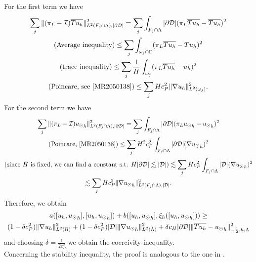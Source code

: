 For the first term we have
\begin{multline*}
\sum _j  \|(\pi_L - \mathcal{I})\avrc{Tu_h}\|^2_{L^2(F_j\cap \Lambda),|\DD|} =\sum _j \int _{F_j \cap \Lambda} |\DD| (\pi_L \avrc{Tu_h}- \avrc{Tu_h})^2
\\
(\text{Average inequality)} \leq \sum _j  \int_{\omega _j \cap \Gamma} (\pi_L \avrc{Tu_h} -Tu_h)^2 
\\
(\text{trace inequality}) \leq \sum _j  \frac 1H \int_{\omega_j}(\pi_L \avrc{Tu_h} - u_h)^2 
\\ 
(\text{Poincare, see \cite[Corollary B.65]{MR2050138}})\leq \sum _j  H c_P ^2 \|\nabla u_h\|^2_{L^2(\omega _j)}.
\end{multline*}
For the second term we have
\begin{multline*}
\sum _j \|(\pi_L - \mathcal{I}){\ud}_h\|^2_{L^2(F_j\cap \Lambda),|\DD|} = \sum _j \int_{F_j\cap \Lambda} |\DD| (\pi_L {\ud}_h -{\ud}_h)^2
\\
(\text{Poincare, \cite[Corollary B.65]{MR2050138}})\leq \sum _j  H^2 c_P^2 \int_{F_j\cap \Lambda} |\DD|(\nabla {\ud}_h)^2
\\
(\text{since $H$ is fixed, we can find a constant s.t. } H|\DD| \lesssim |\D|) \lesssim \sum _j H c_P^2  \int_{F_j\cap \Lambda} |\D|(\nabla {\ud}_h)^2 
\\
\lesssim \sum _j H c_P^2  \|\nabla {\ud}_h\|^2_{L^2(F_j\cap \Lambda),|\D|}.
\end{multline*}
Therefore, we obtain
\begin{multline*}
a([u_h, {u_{\odot}}_h],[u_h, {u_{\odot}}_h] ) + b([u_h, {u_{\odot}}_h], \xi_h([u_h, {u_{\odot}}_h]))
\geq \\
(1-\delta c_P^2) \|\nabla u_h\|^2_{L^2(\Omega)} + (1- \delta c_P^2) |\mathcal{D}|\|\nabla {u_{\odot}}_h\|^2_{L^2(\Lambda)}
+\delta c_H |\partial\mathcal{D}| \|\overline{Tu_h}-{u_{\odot}}_h\|^2_{-\frac 12,h,\Lambda}
\end{multline*}
and choosing $\delta=\frac{1}{2c_P^2}$ we obtain the coercivity inequality.\\
Concerning the stability inequality, the proof is analogous to the one in \cite{burman2014}.

